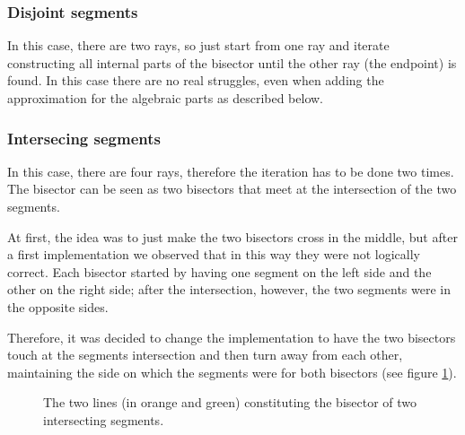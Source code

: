 \documentclass[11pt,a4paper,english]{article}
\begin{document}
	\subsubsection{Disjoint segments}
	In this case, there are two rays, so just start from one ray and iterate constructing all internal parts of the bisector until the other ray (the endpoint) is found. In this case there are no real struggles, even when adding the approximation for the algebraic parts as described below.
	\subsubsection{Intersecing segments}
	In this case, there are four rays, therefore the iteration has to be done two times. The bisector can be seen as two bisectors that meet at the intersection of the two segments.\par
	At first, the idea was to just make the two bisectors cross in the middle, but after a first implementation we observed that in this way they were not logically correct. Each bisector started by having one segment on the left side and the other on the right side; after the intersection, however, the two segments were in the opposite sides.\par
	Therefore, it was decided to change the implementation to have the two bisectors touch at the segments intersection and then turn away from each other, maintaining the side on which the segments were for both bisectors (see figure \ref{fig:intersecting_bisectors}).
	\begin{figure}[h]
    \centering
    \caption{The two lines (in orange and green) constituting the bisector of two intersecting segments. \label{fig:intersecting_bisectors}}
	\end{figure}
	
\end{document}
